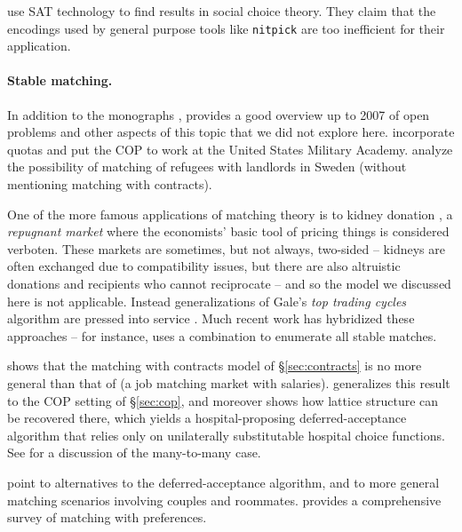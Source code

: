 \documentclass[11pt,a4paper]{article}
\begin{document}
\citet{DBLP:conf/atal/BrandtG14} use SAT technology to find results in
social choice theory. They claim that the encodings used by general
purpose tools like \verb!nitpick!  are too inefficient for their
application.

\paragraph{Stable matching.} In addition to the monographs
\citet{GusfieldIrving:1989,RothSotomayor:1990,Manlove:2013},
\citet{Roth:2008} provides a good overview up to 2007 of open problems
and other aspects of this topic that we did not explore here.
\citet{SonmezSwitzer:2013} incorporate quotas and put the COP to work
at the United States Military Academy. \citet{AnderssonEhlers:2016}
analyze the possibility of matching of refugees with landlords in
Sweden (without mentioning matching with contracts).

One of the more famous applications of matching theory is to kidney
donation \citep{Roth:2015}, a \emph{repugnant market} where the
economists' basic tool of pricing things is considered verboten. These
markets are sometimes, but not always, two-sided -- kidneys are often
exchanged due to compatibility issues, but there are also altruistic
donations and recipients who cannot reciprocate -- and so the model we
discussed here is not applicable. Instead generalizations of Gale's
\emph{top trading cycles} algorithm are pressed into service
\citep{ShapleyScarf:1974,AbdulkadirogluSonmez:1999,SonmezUnver:2010}.
Much recent work has hybridized these approaches -- for instance,
\citet{Dworczak:2016} uses a combination to enumerate all stable
matches.

\citet{Echenique:2012} shows that the matching with contracts model of
\S\ref{sec:contracts} is no more general than that of
\citet{KelsoCrawford:1982} (a job matching market with
salaries). \citeauthor{Schlegel:2015} generalizes this result to the
COP setting of \S\ref{sec:cop}, and moreover shows how lattice
structure can be recovered there, which yields a hospital-proposing
deferred-acceptance algorithm that relies only on unilaterally
substitutable hospital choice functions. See
\citet{HatfieldKominers:2016} for a discussion of the many-to-many
case.

\citet[Theorem~2.33]{RothSotomayor:1990} point to alternatives to the
deferred-acceptance algorithm, and to more general matching scenarios
involving couples and roommates. \citet{Manlove:2013} provides a
comprehensive survey of matching with preferences.
\end{document}
